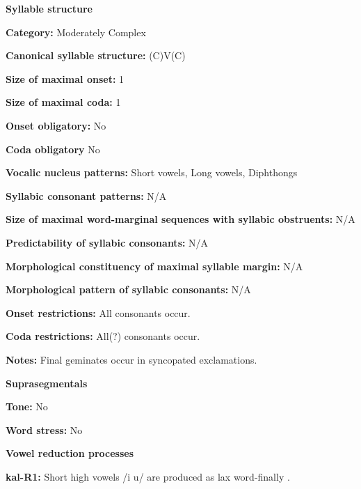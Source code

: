 \textbf{Syllable structure}



\textbf{Category:} Moderately Complex



\textbf{Canonical syllable structure:} (C)V(C) \citep[338-9]{Fortescue1984}



\textbf{Size of maximal onset:} 1



\textbf{Size of maximal coda:} 1



\textbf{Onset obligatory:} No



\textbf{Coda obligatory} No



\textbf{Vocalic nucleus patterns:} Short vowels, Long vowels, Diphthongs



\textbf{Syllabic consonant patterns:} N/A



\textbf{Size of maximal word{}-marginal sequences with syllabic obstruents:} N/A



\textbf{Predictability of syllabic consonants:} N/A



\textbf{Morphological constituency of maximal syllable margin:} N/A



\textbf{Morphological pattern of syllabic consonants:} N/A



\textbf{Onset restrictions:} All consonants occur.



\textbf{Coda restrictions:} All(?) consonants occur.



\textbf{Notes:} Final geminates occur in syncopated exclamations.



\textbf{Suprasegmentals}



\textbf{Tone:} No



\textbf{Word stress:} No



\textbf{Vowel reduction processes}



\textbf{kal-R1:}  Short high vowels /i u/ are produced as lax word-finally \citep[56-63]{Hagerup2011}.



